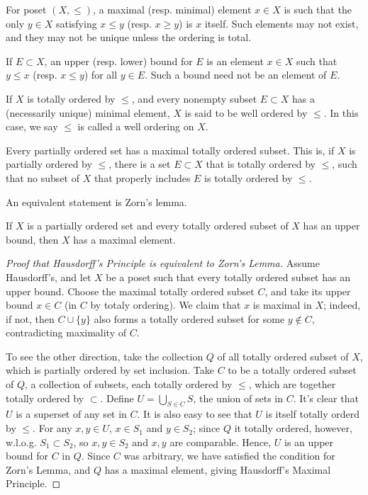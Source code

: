\documentclass[12pt]{article} %
\begin{document}
\begin{definition}
    For poset $(X, \leq)$, a maximal (resp. minimal) element $x \in X$ is such that the only $y \in X$ satisfying $x \leq y$ (resp. $x \geq y$) is $x$ itself. Such elements may not exist, and they may not be unique unless the ordering is total.

    If $E \subset X$, an upper (resp. lower) bound for $E$ is an element $x \in X$ such that $y \leq x$ (resp. $x \leq y$) for all $y \in E$. Such a bound need not be an element of $E$.
\end{definition}

\begin{definition}
    If $X$ is totally ordered by $\leq$, and every nonempty subset $E \subset X$ has a (necessarily unique) minimal element, $X$ is said to be well ordered by $\leq$. In this case, we say $\leq$ is called a well ordering on $X$. 
\end{definition}

\begin{principle}
    Every partially ordered set has a maximal totally ordered subset. This is, if $X$ is partially ordered by $\leq$, there is a set $E \subset X$ that is totally ordered by $\leq$, such that no subset of $X$ that properly includes $E$ is totally ordered by $\leq$.
\end{principle}

\noindent An equivalent statement is Zorn's lemma.

\begin{principle}
    If $X$ is a partially ordered set and every totally ordered subset of $X$ has an upper bound, then $X$ has a maximal element.
\end{principle}

\begin{proof}[Proof that Hausdorff's Principle is equivalent to Zorn's Lemma]
    Assume Hausdorff's, and let $X$ be a poset such that every totally ordered subset has an upper bound. Choose the maximal totally ordered subset $C$, and take its upper bound $x \in C$ (in $C$ by totaly ordering). We claim that $x$ is maximal in $X$; indeed, if not, then $C \cup \{y\}$ also forms a totally ordered subset for some $y \notin C$, contradicting maximality of $C$.

    To see the other direction, take the collection $Q$ of all totally ordered subset of $X$, which is partially ordered by set inclusion. Take $C$ to be a totally ordered subset of $Q$, a collection of subsets, each totally ordered by $\leq$, which are together totally ordered by $\subset$. Define $U = \bigcup_{S \in C} S$, the union of sets in $C$. It's clear that $U$ is a superset of any set in $C$. It is also easy to see that $U$ is itself totally orderd by $\leq$. For any $x, y \in U$, $x \in S_1$ and $y \in S_2$; since $Q$ it totally ordered, however, w.l.o.g. $S_1 \subset S_2$, so $x, y \in S_2$ and $x, y$ are comparable. Hence, $U$ is an upper bound for $C$ in $Q$. Since $C$ was arbitrary, we have satisfied the condition for Zorn's Lemma, and $Q$ has a maximal element, giving Hausdorff's Maximal Principle.
\end{proof}
\end{document}
